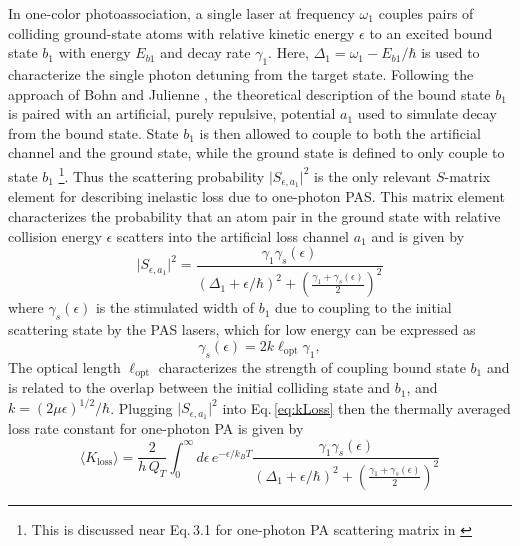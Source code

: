 In one-color photoassociation, a single laser at frequency $\omega_1$ couples pairs of colliding ground-state atoms with relative kinetic energy $\epsilon$ to an excited bound state $b_1$ with energy $E_{b1}$ and decay rate $\gamma_1$.
Here, $\Delta_1 = \omega_1 - E_{b1}/\hbar$ is used to characterize the single photon detuning from the target state.
Following the approach of Bohn and Julienne \cite{Bohn1999}, the theoretical description of the bound state $b_1$ is paired with an artificial, purely repulsive, potential $a_1$ used to simulate decay from the bound state.
State $b_1$ is then allowed to couple to both the artificial channel and the ground state, while the ground state is defined to only couple to state $b_1$ \footnote{This is discussed near Eq.\,3.1 for one-photon PA scattering matrix in \cite{Bohn1999}}.
Thus the scattering probability $\vert S_{\epsilon, a_1} \vert^2$ is the only relevant $S$-matrix element for describing inelastic loss due to one-photon PAS.
This matrix element characterizes the probability that an atom pair in the ground state with relative collision energy $\epsilon$ scatters into the artificial loss channel $a_1$ and is given by
\begin{equation}
	\vert  S_{\epsilon, a_1} \vert^2 = \frac{\gamma_1 \gamma_s(\epsilon)}{(\Delta_1 + \epsilon/ \hbar)^2 + \left( \frac{\gamma_1 + \gamma_s(\epsilon)}{2} \right)^2}
\end{equation}
where ${\gamma}_{s}(\epsilon)$ is the stimulated width of $b_1$ due to coupling to the initial scattering state by the PAS lasers, which for low energy can be expressed as \cite{ctj06,bmc14,Pachomow2017a}
\begin{equation}\label{equationstimulatedwidth}
	{\gamma}_{s}(\epsilon) = 2 k \ell_{\text{opt}} \gamma_1,
\end{equation}
The optical length $\ell_{\text{opt}}$ characterizes the strength of coupling bound state $b_1$ and is related to the overlap between the initial colliding state and $b_1$, and $k=(2\mu \epsilon)^{1/2}/\hbar$.
Plugging $\vert S_{\epsilon, a_1} \vert^2$ into Eq.\,\ref{eq:kLoss} then the thermally averaged loss rate constant for one-photon PA is given by
\begin{equation} \label{eq:onePhotonK}
	\langle K_{\text{loss}} \rangle = \frac{2}{h\,Q_{T}} \int_{0}^{\infty} d\epsilon \,e^{-\epsilon/k_{B}T} \frac{\gamma_1 \gamma_s(\epsilon)}{(\Delta_1 + \epsilon/ \hbar)^2 + \left( \frac{\gamma_1 + \gamma_s(\epsilon)}{2} \right)^2} 
\end{equation}

